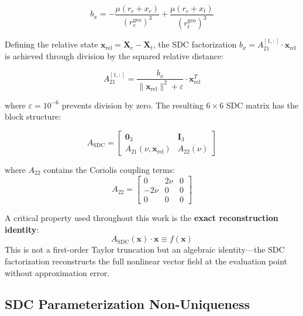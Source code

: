 \documentclass[preprint,3p,times]{elsarticle}
\begin{document}
\begin{equation}
b_x = -\frac{\mu(r_c + x_c)}{(r_c^{\text{geo}})^3} + \frac{\mu(r_c + x_t)}{(r_t^{\text{geo}})^3}
\end{equation}

Defining the relative state $\mathbf{x}_{\text{rel}} = \mathbf{X}_c - \mathbf{X}_t$, the SDC factorization $b_x = A_{21}^{[1,:]} \cdot \mathbf{x}_{\text{rel}}$ is achieved through division by the squared relative distance:

\begin{equation} \label{eq:a21}
A_{21}^{[1,:]} = \frac{b_x}{\|\mathbf{x}_{\text{rel}}\|^2 + \varepsilon} \cdot \mathbf{x}_{\text{rel}}^T
\end{equation}

where $\varepsilon = 10^{-6}$ prevents division by zero. The resulting $6 \times 6$ SDC matrix has the block structure:

\begin{equation} \label{eq:asdc}
A_{\text{SDC}} = \begin{bmatrix}
\mathbf{0}_3 & \mathbf{I}_3 \\
A_{21}(\nu, \mathbf{x}_{\text{rel}}) & A_{22}(\nu)
\end{bmatrix}
\end{equation}

where $A_{22}$ contains the Coriolis coupling terms:
\begin{equation} \label{eq:a22}
A_{22} = \begin{bmatrix}
0 & 2\dot{\nu} & 0 \\
-2\dot{\nu} & 0 & 0 \\
0 & 0 & 0
\end{bmatrix}
\end{equation}

A critical property used throughout this work is the \textbf{exact reconstruction identity}:
\begin{equation}
A_{\text{SDC}}(\mathbf{x}) \cdot \mathbf{x} \equiv f(\mathbf{x}) \label{eq:exact}
\end{equation}
This is not a first-order Taylor truncation but an algebraic identity---the SDC factorization reconstructs the full nonlinear vector field at the evaluation point without approximation error.

\subsection{SDC Parameterization Non-Uniqueness}
\end{document}
